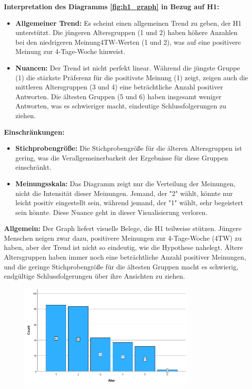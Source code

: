 \textbf{Interpretation des Diagramms \ref{fig:h1_graph} in Bezug auf H1:}
\begin{itemize}
    \item \textbf{Allgemeiner Trend:  }Es scheint einen allgemeinen Trend zu geben, der H1 unterstützt. 
    Die jüngeren Altersgruppen (1 und 2) haben höhere Anzahlen bei den niedrigeren Meinung4TW-Werten 
    (1 und 2), was auf eine positivere Meinung zur 4-Tage-Woche hinweist.
    \item \textbf{Nuancen: }Der Trend ist nicht perfekt linear. Während die jüngste Gruppe (1) die stärkste 
    Präferenz für die positivste Meinung (1) zeigt, zeigen auch die mittleren Altersgruppen (3 und 4) 
    eine beträchtliche Anzahl positiver Antworten. Die ältesten Gruppen (5 und 6) haben insgesamt weniger 
    Antworten, was es schwieriger macht, eindeutige Schlussfolgerungen zu ziehen.
\end{itemize}

\textbf{Einschränkungen:}
\begin{itemize}
    \item \textbf{Stichprobengröße:  }Die Stichprobengröße für die älteren Altersgruppen ist gering, 
    was die Verallgemeinerbarkeit der Ergebnisse für diese Gruppen einschränkt.
    \item \textbf{Meinungsskala: }Das Diagramm zeigt nur die Verteilung der Meinungen, nicht die 
    Intensität dieser Meinungen. Jemand, der "2" wählt, könnte nur leicht positiv eingestellt sein, 
    während jemand, der "1" wählt, sehr begeistert sein könnte. Diese Nuance geht in dieser 
    Visualisierung verloren.
\end{itemize}

\textbf{Allgemein:}
Der Graph liefert visuelle Belege, die H1 teilweise stützen. Jüngere Menschen neigen zwar dazu, 
positivere Meinungen zur 4-Tage-Woche (4TW) zu haben, aber der Trend ist nicht so eindeutig, wie 
die Hypothese nahelegt. Ältere Altersgruppen haben immer noch eine beträchtliche Anzahl positiver 
Meinungen, und die geringe Stichprobengröße für die ältesten Gruppen macht es schwierig, endgültige 
Schlussfolgerungen über ihre Ansichten zu ziehen.

\begin{figure}[h]
    \centering
    \includegraphics[width=0.8\textwidth]{04_Artefakte/01_Abbildungen/hypothese_1/h1_saeulen.png}
    \caption{}
    \label{fig:h1_saeulen}
\end{figure}

